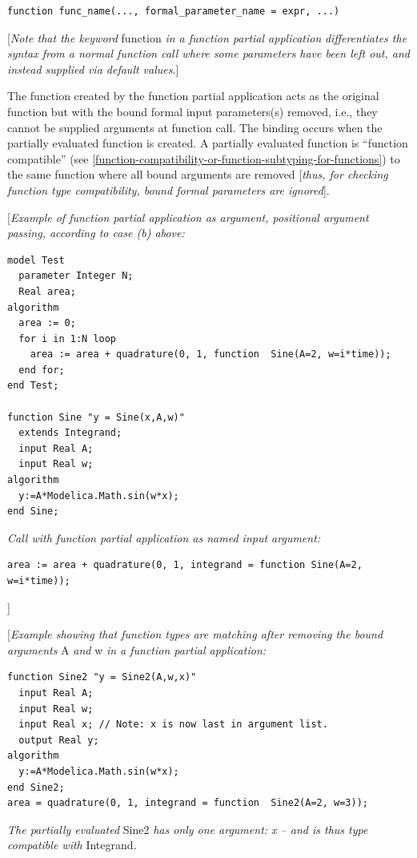 \documentclass[10pt,a4paper]{report}
\begin{document}
\begin{lstlisting}[language=modelica]
  function func_name(..., formal_parameter_name = expr, ...)
\end{lstlisting}
{[}\emph{Note that the keyword} function \emph{in a function partial
application} \emph{differentiates the syntax from a normal function call
where some parameters have been left out, and instead supplied via
default values}.{]}

The function created by the function partial application acts as the
original function but with the bound formal input parameters(s) removed,
i.e., they cannot be supplied arguments at function call. The binding
occurs when the partially evaluated function is created. A partially
evaluated function is ``function compatible'' (see \ref{function-compatibility-or-function-subtyping-for-functions}) to the
same function where all bound arguments are removed {[}\emph{thus, for
checking function type compatibility, bound formal parameters are
ignored}{]}.

{[}\emph{Example of function partial application as argument, positional
argument passing, according to case (b) above:}

\begin{lstlisting}[language=modelica]
model Test
  parameter Integer N;
  Real area;
algorithm
  area := 0;
  for i in 1:N loop
    area := area + quadrature(0, 1, function  Sine(A=2, w=i*time));
  end for;
end Test;

function Sine "y = Sine(x,A,w)"
  extends Integrand;
  input Real A;
  input Real w;
algorithm
  y:=A*Modelica.Math.sin(w*x);
end Sine;
\end{lstlisting}
\emph{Call with function partial application as named input argument:}
\begin{lstlisting}[language=modelica]
area := area + quadrature(0, 1, integrand = function Sine(A=2, w=i*time));
\end{lstlisting}
{]}

{[}\emph{Example showing that function types are matching after removing
the bound arguments} A \emph{and} w \emph{in a function partial
application:}

\begin{lstlisting}[language=modelica]
  function Sine2 "y = Sine2(A,w,x)"
  input Real A;
  input Real w;
  input Real x; // Note: x is now last in argument list.
  output Real y;
algorithm
  y:=A*Modelica.Math.sin(w*x);
end Sine2;
area = quadrature(0, 1, integrand = function  Sine2(A=2, w=3));
\end{lstlisting}
\emph{The partially evaluated} Sine2 \emph{has only one argument: x --
and is thus type compatible with} Integrand\emph{.}
\end{document}
